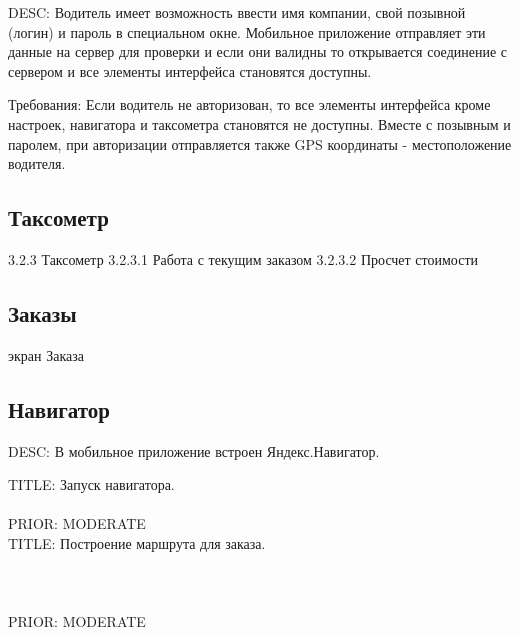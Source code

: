  		DESC: Водитель имеет возможность ввести имя компании, свой позывной (логин) и пароль в специальном окне. Мобильное приложение отправляет эти данные на сервер для проверки и если они валидны то открывается соединение с сервером и все элементы интерфейса становятся доступны.

  		Требования: 
  		Если водитель не авторизован, то все элементы интерфейса кроме настроек, навигатора и таксометра становятся не доступны.
  		Вместе с позывным и паролем, при авторизации отправляется также GPS координаты - местоположение водителя.

  \subsection{Таксометр}


    3.2.3 Таксометр
    3.2.3.1 Работа с текущим заказом
    3.2.3.2 Просчет стоимости

  \subsection{Заказы}

    экран Заказа

  \subsection{Навигатор}

    DESC: В мобильное приложение встроен Яндекс.Навигатор.


      TITLE: Запуск навигатора.\\
      \\
      PRIOR: MODERATE\\

      TITLE: Построение маршрута для заказа.\\
      \\
      \\
      \\
      PRIOR: MODERATE\\

